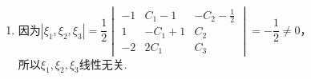 \documentclass[UTF8,12pt,a4paper,fontset=fandol]{ctexart}
\begin{document}
\begin{solve}
\begin{enumerate}
\[\bar{B}=\begin{pmatrix}
                              A^2 & \xi_1
                          \end{pmatrix}=\begin{pmatrix}
                              2  & 2  & 0 & 1  \\
                              -2 & -2 & 0 & 1  \\
                              4  & 4  & 0 & -2
                          \end{pmatrix}
                          \rightarrow\begin{pmatrix}
                              1 & 1 & 0 & -\frac 12 \\
                              0 & 0 & 0 & 0         \\
                              0 & 0 & 0 & 0
                          \end{pmatrix}\]
，\\
                      则$A^2X=\xi_1$的通解\\
                      
\[\xi_3=C_2\begin{pmatrix}
                              -1 \\
                              1  \\
                              0
                          \end{pmatrix}+C_3\begin{pmatrix}
                              0 \\
                              0 \\
                              1
                          \end{pmatrix}+\begin{pmatrix}
                              -\frac 12 \\
                              0         \\
                              0
                          \end{pmatrix}=\begin{pmatrix}
                              -C_2 - \frac 12 \\
                              C_2             \\
                              C_3
                          \end{pmatrix}\]
（其中$C_2, C_3$为任意常数）.
                \item
                      因为$|\xi_1,\xi_2,\xi_3|=\dfrac 12\begin{vmatrix}
                              -1 & C_1 - 1  & -C_2 - \frac 12 \\
                              1  & -C_1 + 1 & C_2             \\
                              -2 & 2C_1     & C_3
                          \end{vmatrix}=-\dfrac 12\neq 0$，\\
                      所以$\xi_1,\xi_2,\xi_3$线性无关.
            \end{enumerate}
\end{solve}
\end{document}
